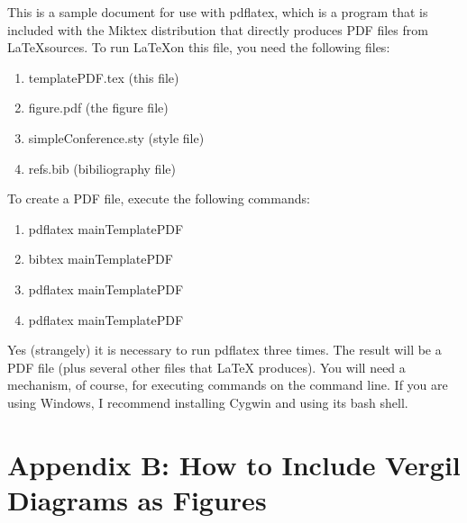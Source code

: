 \documentclass[10pt,twocolumn]{article}
\begin{document}
This is a sample document for use with pdflatex, which is
a program that is included with the Miktex distribution
that directly produces PDF files from \LaTeX sources.
To run \LaTeX on this file, you need the following files:
\begin{enumerate}
\item templatePDF.tex (this file)
\item figure.pdf (the figure file)
\item simpleConference.sty (style file)
\item refs.bib (bibiliography file)
\end{enumerate}
\noindent
To create a PDF file, execute the following commands:
\begin{enumerate}
\item pdflatex mainTemplatePDF
\item bibtex mainTemplatePDF
\item pdflatex mainTemplatePDF
\item pdflatex mainTemplatePDF
\end{enumerate}
\noindent
Yes (strangely) it is necessary to run pdflatex three times.
The result will be a PDF file (plus several other files that \LaTeX
produces).  You will need a mechanism, of course, for executing
commands on the command line. If you are using Windows, I recommend
installing Cygwin and using its bash shell.








\section{Appendix B: How to Include Vergil Diagrams as Figures}

\cite{PtolemyVol1:04}




\end{document}
